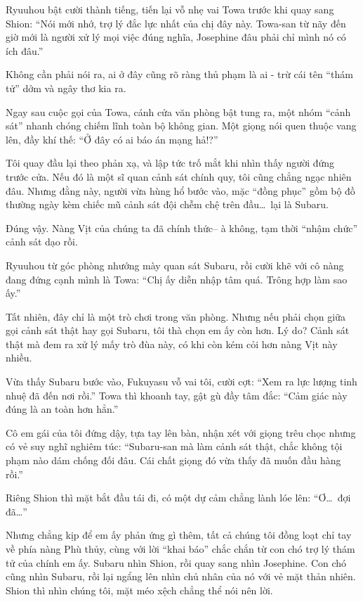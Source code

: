 \documentclass[../main.tex]{subfiles}
\begin{document}
Ryuuhou bật cười thành tiếng, tiến lại vỗ nhẹ vai Towa trước khi quay sang Shion: ``Nói mới nhớ, trợ lý đắc lực nhất của chị đây này. Towa-san từ nãy đến giờ mới là người xử lý mọi việc đúng nghĩa, Josephine đâu phải chỉ mình nó có ích đâu.''

Không cần phải nói ra, ai ở đây cũng rõ ràng thủ phạm là ai - trừ cái tên ``thám tử'' dởm và ngây thơ kia ra.
\omk

Ngay sau cuộc gọi của Towa, cánh cửa văn phòng bật tung ra, một nhóm ``cảnh sát'' nhanh chóng chiếm lĩnh toàn bộ không gian. Một giọng nói quen thuộc vang lên, đầy khí thế: ``Ở đây có ai báo án mạng hả!?''

Tôi quay đầu lại theo phản xạ, và lập tức trố mắt khi nhìn thấy người đứng trước cửa. Nếu đó là một sĩ quan cảnh sát chính quy, tôi cũng chẳng ngạc nhiên đâu. Nhưng đằng này, người vừa hùng hổ bước vào, mặc ``đồng phục'' gồm bộ đồ thường ngày kèm chiếc mũ cảnh sát đội chễm chệ trên đầu\dots\ lại là Subaru.

Đúng vậy. Nàng Vịt của chúng ta đã chính thức-- à không, tạm thời ``nhậm chức'' cảnh sát dạo rồi.

Ryuuhou từ góc phòng nhướng mày quan sát Subaru, rồi cười khẽ với cô nàng đang đứng cạnh mình là Towa: ``Chị ấy diễn nhập tâm quá. Trông hợp làm sao ấy.''

Tất nhiên, đây chỉ là một trò chơi trong văn phòng. Nhưng nếu phải chọn giữa gọi cảnh sát thật hay gọi Subaru, tôi thà chọn em ấy còn hơn. Lý do? Cảnh sát thật mà đem ra xử lý mấy trò đùa này, có khi còn kém cỏi hơn nàng Vịt này nhiều.

Vừa thấy Subaru bước vào, Fukuyasu vỗ vai tôi, cười cợt: ``Xem ra lực lượng tinh nhuệ đã đến nơi rồi.'' Towa thì khoanh tay, gật gù đầy tâm đắc: ``Cảm giác này đúng là an toàn hơn hẳn.''

Cô em gái của tôi đứng dậy, tựa tay lên bàn, nhận xét với giọng trêu chọc nhưng có vẻ suy nghĩ nghiêm túc: ``Subaru-san mà làm cảnh sát thật, chắc không tội phạm nào dám chống đối đâu. Cái chất giọng đó vừa thấy đã muốn đầu hàng rồi.''

Riêng Shion thì mặt bắt đầu tái đi, có một dự cảm chẳng lành lóe lên: ``Ơ\dots\ đợi đã\dots''

Nhưng chẳng kịp để em ấy phản ứng gì thêm, tất cả chúng tôi đồng loạt chỉ tay về phía nàng Phù thủy, cùng với lời ``khai báo'' chắc chắn từ con chó trợ lý thám tử của chính em ấy. Subaru nhìn Shion, rồi quay sang nhìn Josephine. Con chó cũng nhìn Subaru, rồi lại ngẩng lên nhìn chủ nhân của nó với vẻ mặt thản nhiên. Shion thì nhìn chúng tôi, mặt méo xệch chẳng thể nói nên lời.
\end{document}
